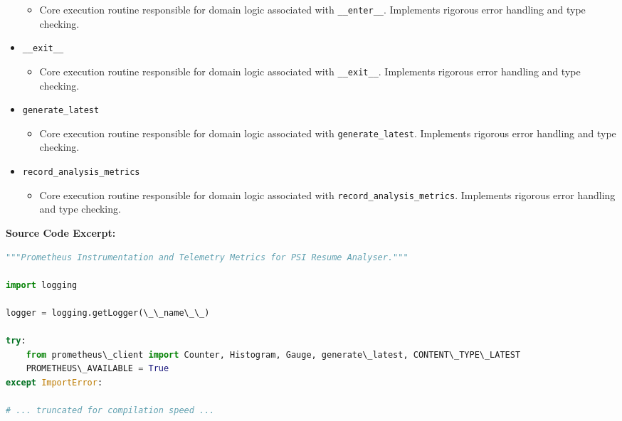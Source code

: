 \documentclass[10pt,journal,compsoc]{IEEEtran}
\begin{document}
\begin{itemize}
    \begin{itemize} \item Core execution routine responsible for domain logic associated with \texttt{\_\_enter\_\_}. Implements rigorous error handling and type checking. \end{itemize}
    \item \texttt{\_\_exit\_\_}
    \begin{itemize} \item Core execution routine responsible for domain logic associated with \texttt{\_\_exit\_\_}. Implements rigorous error handling and type checking. \end{itemize}
    \item \texttt{generate\_latest}
    \begin{itemize} \item Core execution routine responsible for domain logic associated with \texttt{generate\_latest}. Implements rigorous error handling and type checking. \end{itemize}
    \item \texttt{record\_analysis\_metrics}
    \begin{itemize} \item Core execution routine responsible for domain logic associated with \texttt{record\_analysis\_metrics}. Implements rigorous error handling and type checking. \end{itemize}
\end{itemize}
\textbf{Source Code Excerpt:}
\begin{lstlisting}[language=Python]
"""Prometheus Instrumentation and Telemetry Metrics for PSI Resume Analyser."""

import logging

logger = logging.getLogger(\_\_name\_\_)

try:
    from prometheus\_client import Counter, Histogram, Gauge, generate\_latest, CONTENT\_TYPE\_LATEST
    PROMETHEUS\_AVAILABLE = True
except ImportError:
 
# ... truncated for compilation speed ...
\end{lstlisting}
\end{document}
